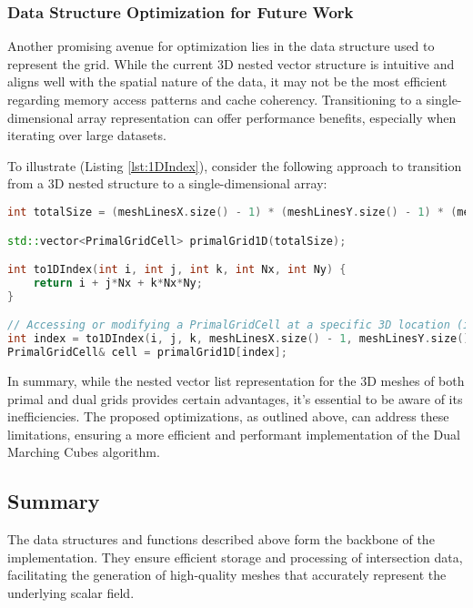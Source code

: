 \subsubsection{Data Structure Optimization for Future Work} \label{Data-Structure-Optimization}

Another promising avenue for optimization lies in the data structure used to represent the grid. While the current 3D nested vector structure is intuitive and aligns well with the spatial nature of the data, it may not be the most efficient regarding memory access patterns and cache coherency. Transitioning to a single-dimensional array representation can offer performance benefits, especially when iterating over large datasets. 

To illustrate (Listing \ref{lst:1DIndex}), consider the following approach to transition from a 3D nested structure to a single-dimensional array:

\vspace{2mm}
\begin{lstlisting}[language=C++, caption=Transition from a 3D nested vector structure to a single-dimensional array representation for efficient memory access., label=lst:1DIndex]
int totalSize = (meshLinesX.size() - 1) * (meshLinesY.size() - 1) * (meshLinesZ.size() - 1);

std::vector<PrimalGridCell> primalGrid1D(totalSize);

int to1DIndex(int i, int j, int k, int Nx, int Ny) {
    return i + j*Nx + k*Nx*Ny;
}

// Accessing or modifying a PrimalGridCell at a specific 3D location (i, j, k)
int index = to1DIndex(i, j, k, meshLinesX.size() - 1, meshLinesY.size() - 1);
PrimalGridCell& cell = primalGrid1D[index];
\end{lstlisting}

In summary, while the nested vector list representation for the 3D meshes of both primal and dual grids provides certain advantages, it's essential to be aware of its inefficiencies. The proposed optimizations, as outlined above, can address these limitations, ensuring a more efficient and performant implementation of the Dual Marching Cubes algorithm.

\subsection{Summary}

The data structures and functions described above form the backbone of the implementation. They ensure efficient storage and processing of intersection data, facilitating the generation of high-quality meshes that accurately represent the underlying scalar field.


